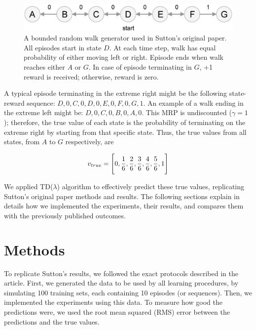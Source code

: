 \documentclass{article}
\begin{document}
\begin{figure}[t]
    \includegraphics[scale=0.3]{./images/random_walk.eps}
    \centering
    \caption{A bounded random walk generator used in Sutton's original paper.
    All episodes start in state $D$.
    At each time step, walk has equal probability of either moving left or right.
    Episode ends when walk reaches either $A$ or $G$.
    In case of episode terminating in $G$, +1 reward is received;
    otherwise, reward is zero.}
    \label{fig:1}
\end{figure}

A typical episode terminating in the extreme right might be the following state-reward sequence: $D, 0, C, 0, D, 0, E, 0, F, 0, G, 1$.
An example of a walk ending in the extreme left might be: $D, 0, C, 0, B, 0, A, 0$.
This MRP is undiscounted ($\gamma = 1$);
therefore, the true value of each state is the probability of terminating on the extreme right by starting from that specific state.
Thus, the true values from all states, from $A$ to $G$ respectively, are

\begin{equation}
    v_{true} = \Bigg[0, \frac{1}{6}, \frac{2}{6}, \frac{3}{6}, \frac{4}{6}, \frac{5}{6}, 1\Bigg]
    \centering
\end{equation}

We applied TD($\lambda$) algorithm to effectively predict these true values, replicating Sutton's original paper methods and results.
The following sections explain in details how we implemented the experiments, their results, and compares them with the previously published outcomes.

\section{Methods}
\label{sec:methods}
To replicate Sutton's results, we followed the exact protocols described in the article.
First, we generated the data to be used by all learning procedures, by simulating 100 training sets, each containing 10 episodes (or sequences).
Then, we implemented the experiments using this data.
To measure how good the predictions were, we used the root mean squared (RMS) error between the predictions and the true values.
\end{document}
